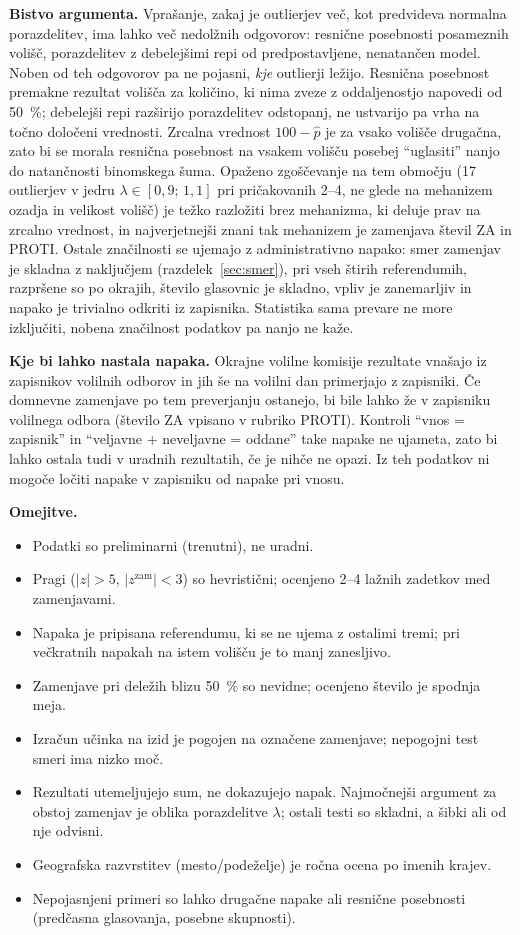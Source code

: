 \documentclass[11pt,a4paper]{article}
\begin{document}
\textbf{Bistvo argumenta.} Vprašanje, zakaj je outlierjev več, kot predvideva normalna porazdelitev, ima lahko več nedolžnih odgovorov: resnične posebnosti posameznih volišč, porazdelitev z debelejšimi repi od predpostavljene, nenatančen model. Noben od teh odgovorov pa ne pojasni, \emph{kje} outlierji ležijo. Resnična posebnost premakne rezultat volišča za količino, ki nima zveze z oddaljenostjo napovedi od 50~\%; debelejši repi razširijo porazdelitev odstopanj, ne ustvarijo pa vrha na točno določeni vrednosti. Zrcalna vrednost $100-\hat p$ je za vsako volišče drugačna, zato bi se morala resnična posebnost na vsakem volišču posebej ``uglasiti'' nanjo do natančnosti binomskega šuma. Opaženo zgoščevanje na tem območju (17 outlierjev v jedru $\lambda\in[0{,}9;\,1{,}1]$ pri pričakovanih 2--4, ne glede na mehanizem ozadja in velikost volišč) je težko razložiti brez mehanizma, ki deluje prav na zrcalno vrednost, in najverjetnejši znani tak mehanizem je zamenjava števil ZA in PROTI. Ostale značilnosti se ujemajo z administrativno napako: smer zamenjav je skladna z naključjem (razdelek~\ref{sec:smer}), pri vseh štirih referendumih, razpršene so po okrajih, število glasovnic je skladno, vpliv je zanemarljiv in napako je trivialno odkriti iz zapisnika. Statistika sama prevare ne more izključiti, nobena značilnost podatkov pa nanjo ne kaže.

\textbf{Kje bi lahko nastala napaka.} Okrajne volilne komisije rezultate vnašajo iz zapisnikov volilnih odborov in jih še na volilni dan primerjajo z zapisniki. Če domnevne zamenjave po tem preverjanju ostanejo, bi bile lahko že v zapisniku volilnega odbora (število ZA vpisano v rubriko PROTI). Kontroli ``vnos = zapisnik'' in ``veljavne + neveljavne = oddane'' take napake ne ujameta, zato bi lahko ostala tudi v uradnih rezultatih, če je nihče ne opazi. Iz teh podatkov ni mogoče ločiti napake v zapisniku od napake pri vnosu.

\textbf{Omejitve.}
\begin{itemize}
\item Podatki so preliminarni (trenutni), ne uradni.
\item Pragi ($|z|>5$, $|z^{\text{zam}}|<3$) so hevristični; ocenjeno 2--4 lažnih zadetkov med zamenjavami.
\item Napaka je pripisana referendumu, ki se ne ujema z ostalimi tremi; pri večkratnih napakah na istem volišču je to manj zanesljivo.
\item Zamenjave pri deležih blizu 50~\% so nevidne; ocenjeno število je spodnja meja.
\item Izračun učinka na izid je pogojen na označene zamenjave; nepogojni test smeri ima nizko moč.
\item Rezultati utemeljujejo sum, ne dokazujejo napak. Najmočnejši argument za obstoj zamenjav je oblika porazdelitve $\lambda$; ostali testi so skladni, a šibki ali od nje odvisni.
\item Geografska razvrstitev (mesto/podeželje) je ročna ocena po imenih krajev.
\item Nepojasnjeni primeri so lahko drugačne napake ali resnične posebnosti (predčasna glasovanja, posebne skupnosti).
\end{itemize}
\end{document}

